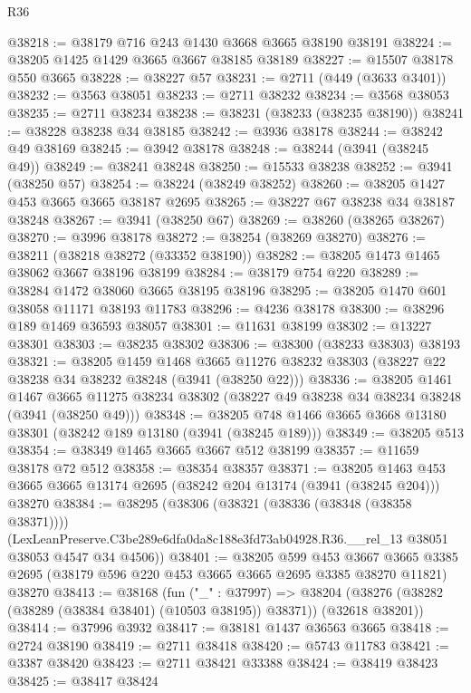 \begin{lexlean}{R36}
\begin{coremodule}
@38218 := @38179 @716 @243 @1430 @3668 @3665 @38190 @38191
@38224 := @38205 @1425 @1429 @3665 @3667 @38185 @38189
@38227 := @15507 @38178 @550 @3665
@38228 := @38227 @57
@38231 := @2711 (@449 (@3633 @3401))
@38232 := @3563 @38051
@38233 := @2711 @38232
@38234 := @3568 @38053
@38235 := @2711 @38234
@38238 := @38231 (@38233 (@38235 @38190))
@38241 := @38228 @38238 @34 @38185
@38242 := @3936 @38178
@38244 := @38242 @49 @38169
@38245 := @3942 @38178
@38248 := @38244 (@3941 (@38245 @49))
@38249 := @38241 @38248
@38250 := @15533 @38238
@38252 := @3941 (@38250 @57)
@38254 := @38224 (@38249 @38252)
@38260 := @38205 @1427 @453 @3665 @3665 @38187 @2695
@38265 := @38227 @67 @38238 @34 @38187 @38248
@38267 := @3941 (@38250 @67)
@38269 := @38260 (@38265 @38267)
@38270 := @3996 @38178
@38272 := @38254 (@38269 @38270)
@38276 := @38211 (@38218 @38272 (@33352 @38190))
@38282 := @38205 @1473 @1465 @38062 @3667 @38196 @38199
@38284 := @38179 @754 @220
@38289 := @38284 @1472 @38060 @3665 @38195 @38196
@38295 := @38205 @1470 @601 @38058 @11171 @38193 @11783
@38296 := @4236 @38178
@38300 := @38296 @189 @1469 @36593 @38057
@38301 := @11631 @38199
@38302 := @13227 @38301
@38303 := @38235 @38302
@38306 := @38300 (@38233 @38303) @38193
@38321 := @38205
    @1459
    @1468
    @3665
    @11276
    @38232
    @38303
    (@38227 @22 @38238 @34 @38232 @38248 (@3941 (@38250 @22)))
@38336 := @38205
    @1461
    @1467
    @3665
    @11275
    @38234
    @38302
    (@38227 @49 @38238 @34 @38234 @38248 (@3941 (@38250 @49)))
@38348 := @38205 @748 @1466 @3665 @3668 @13180 @38301 (@38242 @189 @13180 (@3941 (@38245 @189)))
@38349 := @38205 @513
@38354 := @38349 @1465 @3665 @3667 @512 @38199
@38357 := @11659 @38178 @72 @512
@38358 := @38354 @38357
@38371 := @38205
    @1463
    @453
    @3665
    @3665
    @13174
    @2695
    (@38242 @204 @13174 (@3941 (@38245 @204)))
    @38270
@38384 := @38295
    (@38306
      (@38321 (@38336 (@38348 (@38358 @38371))))
      (LexLeanPreserve.C3be289e6dfa0da8c188e3fd73ab04928.R36.__rel_13
        @38051
        @38053
        @4547
        @34
        @4506))
@38401 := @38205
    @599
    @453
    @3667
    @3665
    @3385
    @2695
    (@38179 @596 @220 @453 @3665 @3665 @2695 @3385 @38270 @11821)
    @38270
@38413 := @38168
    (fun ("_" : @37997) =>
    @38204 (@38276 (@38282 (@38289 (@38384 @38401) (@10503 @38195)) @38371)) (@32618 @38201))
@38414 := @37996 @3932
@38417 := @38181 @1437 @36563 @3665
@38418 := @2724 @38190
@38419 := @2711 @38418
@38420 := @5743 @11783
@38421 := @3387 @38420
@38423 := @2711 @38421 @33388
@38424 := @38419 @38423
@38425 := @38417 @38424

\end{coremodule}
\end{lexlean}
